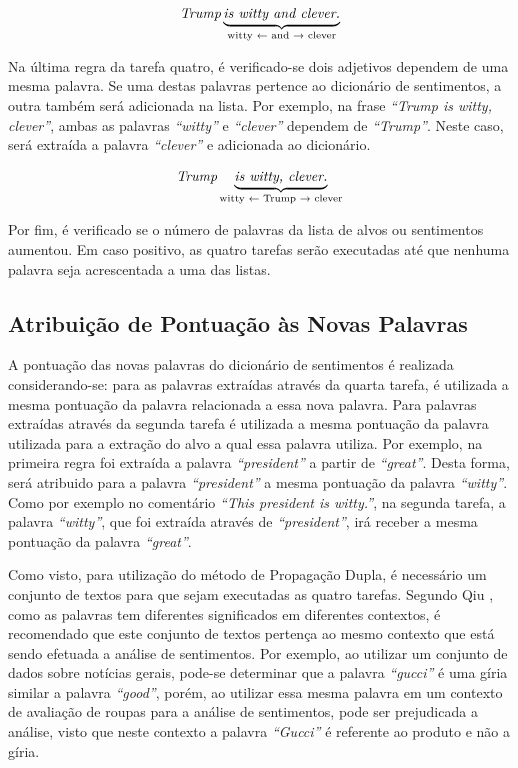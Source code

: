\[\textit{Trump} \underbrace{\textit{is witty and clever.}}_\text{witty
\textleftarrow \text{ and} \textrightarrow \text{ clever}}\]


Na última regra da tarefa quatro, é verificado-se dois adjetivos
dependem de uma mesma palavra. Se uma destas palavras pertence ao dicionário de
sentimentos, a outra também será adicionada na lista. Por exemplo, na frase
\textit{``Trump is witty, clever''}, ambas as palavras \textit{``witty''} e
\textit{``clever''} dependem de \textit{``Trump''}. Neste caso, será extraída a
palavra \textit{``clever''} e adicionada ao dicionário.

\[\textit{Trump} \underbrace{\textit{is witty, clever.}}_\text{witty
\textleftarrow \text{ Trump} \textrightarrow \text{ clever}}\]

Por fim, é verificado se o número de palavras da lista de alvos ou sentimentos
aumentou. Em caso positivo, as quatro tarefas serão executadas até que nenhuma palavra seja acrescentada a
uma das listas.

\subsection{Atribuição de Pontuação às Novas Palavras}
A pontuação das novas palavras do dicionário de sentimentos é realizada
considerando-se: para as palavras extraídas através da quarta tarefa, é
utilizada a mesma pontuação da palavra relacionada a essa nova palavra. Para palavras extraídas através da segunda tarefa é utilizada a mesma pontuação
da palavra utilizada para a extração do alvo a qual essa palavra utiliza. Por
exemplo, na primeira regra foi extraída a palavra \textit{``president''} a
partir de \textit{``great''}. Desta forma, será atribuido para a palavra
\textit{``president''} a mesma pontuação da palavra \textit{``witty''}. Como por
exemplo no comentário \textit{``This president is witty.''}, na
segunda tarefa, a palavra \textit{``witty''}, que foi extraída através de \textit{``president''}, irá receber a mesma pontuação da palavra \textit{``great''}.

Como visto, para utilização do método de Propagação Dupla, é necessário um
conjunto de textos para que sejam executadas as quatro tarefas. Segundo Qiu
\cite{Qiu:2011:OWE:1970420.1970422}, como as palavras tem diferentes
significados em diferentes contextos, é recomendado que este conjunto de textos
pertença ao mesmo contexto que está sendo efetuada a análise de sentimentos. Por
exemplo, ao utilizar um conjunto de dados sobre notícias gerais, pode-se
determinar que a palavra \textit{``gucci''} é uma gíria similar a palavra
\textit{``good''}, porém, ao utilizar essa mesma palavra em um contexto de
avaliação de roupas para a análise de sentimentos, pode ser prejudicada a
análise, visto que neste contexto a palavra \textit{``Gucci''} é referente ao produto e não a gíria.

